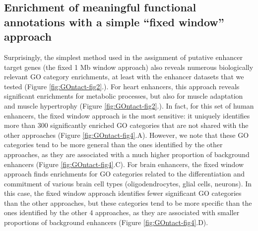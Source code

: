 \subsection{Enrichment of meaningful functional annotations with a simple “fixed window” approach}

Surprisingly, the simplest method used in the assignment of putative enhancer target genes (the fixed 1 Mb window approach) also reveals numerous biologically relevant GO category enrichments, at least with the enhancer datasets that we tested (Figure \ref{fig:GOntact-fig2}.). For heart enhancers, this approach reveals significant enrichments for metabolic processes, but also for muscle adaptation and muscle hypertrophy (Figure \ref{fig:GOntact-fig2}.). In fact, for this set of human enhancers, the fixed window approach is the most sensitive: it uniquely identifies more than 300 significantly enriched GO categories that are not shared with the other approaches (Figure \ref{fig:GOntact-fig4}.A). However, we note that these GO categories tend to be more general than the ones identified by the other approaches, as they are associated with a much higher proportion of background enhancers (Figure \ref{fig:GOntact-fig4}.C). For brain enhancers, the fixed window approach finds enrichments for GO categories related to the differentiation and commitment of various brain cell types (oligodendrocytes, glial cells, neurons). In this case, the fixed window approach identifies fewer significant GO categories than the other approaches, but these categories tend to be more specific than the ones identified by the other 4 approaches, as they are associated with smaller proportions of background enhancers (Figure \ref{fig:GOntact-fig4}.D).

